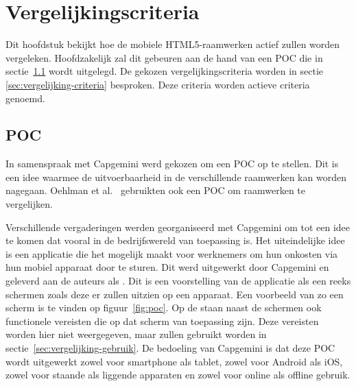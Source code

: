 \chapter{Vergelijkingscriteria}
\label{chap:vergelijkingscriteria}

Dit hoofdstuk bekijkt hoe de mobiele HTML5-raamwerken actief zullen worden vergeleken.
Hoofdzakelijk zal dit gebeuren aan de hand van een POC die in sectie~\ref{sec:vergelijking-poc} wordt uitgelegd.
De gekozen vergelijkingscriteria worden in sectie \ref{sec:vergelijking-criteria} besproken.
Deze criteria worden actieve criteria genoemd.


\section{POC}
\label{sec:vergelijking-poc}
In samenspraak met Capgemini werd gekozen om een POC op te stellen.
Dit is een idee waarmee de uitvoerbaarheid in de verschillende raamwerken kan worden nagegaan.
Oehlman et al.~\cite{Oeflman2011} gebruikten ook een POC om raamwerken te vergelijken.

Verschillende vergaderingen werden georganiseerd met Capgemini om tot een idee te komen dat vooral in de bedrijfswereld van toepassing is.
Het uiteindelijke idee is een applicatie die het mogelijk maakt voor werknemers om hun onkosten via hun mobiel apparaat door te sturen.
Dit werd uitgewerkt door Capgemini en geleverd aan de auteurs als .
Dit is een voorstelling van de applicatie als een reeks schermen zoals deze er zullen uitzien op een apparaat. 
Een voorbeeld van zo een scherm is te vinden op figuur~\ref{fig:poc}. 
Op de  staan naast de schermen ook functionele vereisten die op dat scherm van toepassing zijn.
Deze vereisten worden hier niet weergegeven, maar zullen gebruikt worden in sectie~\ref{sec:vergelijking-gebruik}.
De bedoeling van Capgemini is dat deze POC wordt uitgewerkt zowel voor smartphone als tablet, zowel voor Android als iOS, zowel voor staande als liggende apparaten en zowel voor online als offline gebruik.


